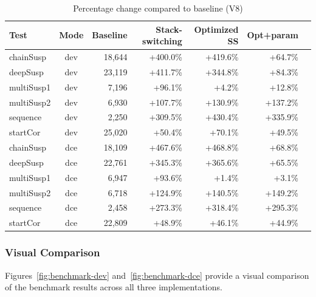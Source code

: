 \begin{table}[H]
\centering
\caption{Percentage change compared to baseline (V8)}
\label{tab:benchmark-percentage}
\begin{tabular}{|l|c|r|r|r|r|r|}
\hline
\textbf{Test} & \textbf{Mode} & \textbf{Baseline} & \textbf{Stack-switching} & \textbf{Optimized SS} & \textbf{Opt+param} \\
\hline
chainSusp & dev & 18,644 & +400.0\% & +419.6\% & +64.7\% \\
deepSusp & dev & 23,119 & +411.7\% & +344.8\% & +84.3\% \\
multiSusp1 & dev & 7,196 & +96.1\% & +4.2\% & +12.8\% \\
multiSusp2 & dev & 6,930 & +107.7\% & +130.9\% & +137.2\% \\
sequence & dev & 2,250 & +309.5\% & +430.4\% & +335.9\% \\
startCor & dev & 25,020 & +50.4\% & +70.1\% & +49.5\% \\
\hline
chainSusp & dce & 18,109 & +467.6\% & +468.8\% & +68.8\% \\
deepSusp & dce & 22,761 & +345.3\% & +365.6\% & +65.5\% \\
multiSusp1 & dce & 6,947 & +93.6\% & +1.4\% & +3.1\% \\
multiSusp2 & dce & 6,718 & +124.9\% & +140.5\% & +149.2\% \\
sequence & dce & 2,458 & +273.3\% & +318.4\% & +295.3\% \\
startCor & dce & 22,809 & +48.9\% & +46.1\% & +44.9\% \\
\hline
\end{tabular}
\end{table}

\subsubsection*{Visual Comparison}

Figures~\ref{fig:benchmark-dev} and~\ref{fig:benchmark-dce} provide a visual comparison of the benchmark results across
all three implementations.


